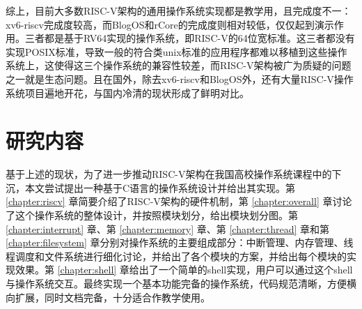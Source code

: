 综上，目前大多数RISC-V架构的通用操作系统实现都是教学用，且完成度不一：xv6-riscv完成度较高，而BlogOS和rCore的完成度则相对较低，仅仅起到演示作用。三者都是基于RV64实现的操作系统，即RISC-V的64位宽标准。这三者都没有实现POSIX标准\cite{DBLP:journals/computer/Isaak90a}，导致一般的符合类unix标准的应用程序都难以移植到这些操作系统上，这使得这三个操作系统的兼容性较差，而RISC-V架构被广为质疑的问题之一就是生态问题。且在国外，除去xv6-riscv和BlogOS外，还有大量RISC-V操作系统项目遍地开花，与国内冷清的现状形成了鲜明对比。

\section{研究内容}

基于上述的现状，为了进一步推动RISC-V架构在我国高校操作系统课程中的下沉，本文尝试提出一种基于C语言的操作系统设计并给出其实现。第 \ref{chapter:riscv} 章简要介绍了RISC-V架构的硬件机制，第 \ref{chapter:overall} 章讨论了这个操作系统的整体设计，并按照模块划分，给出模块划分图。第 \ref{chapter:interrupt} 章、第 \ref{chapter:memory} 章、第 \ref{chapter:thread} 章和第 \ref{chapter:filesystem} 章分别对操作系统的主要组成部分：中断管理、内存管理、线程调度和文件系统进行细化讨论，并给出了各个模块的方案，并给出每个模块的实现效果。第 \ref{chapter:shell} 章给出了一个简单的shell实现，用户可以通过这个shell与操作系统交互。最终实现一个基本功能完备的操作系统，代码规范清晰，方便横向扩展，同时文档完备，十分适合作教学使用。